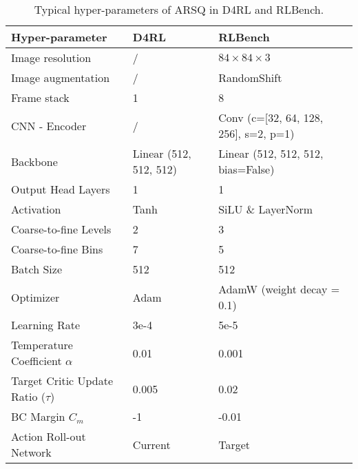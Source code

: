 \begin{table}[ht]
\centering
\begin{tabular}{lll}
    \toprule
    Hyper-parameter & D4RL & RLBench \\
    \midrule
    Image resolution & / & $84 \times 84 \times 3$ \\
    Image augmentation & / & RandomShift \\
    Frame stack & 1 & 8 \\
    \midrule
    CNN - Encoder & / & Conv (c=[32, 64, 128, 256], s=2, p=1) \\
    Backbone & Linear (512, 512, 512) & Linear (512, 512, 512, bias=False) \\
    Output Head Layers & 1 & 1 \\
    Activation & Tanh & SiLU \& LayerNorm \\
    \midrule
    Coarse-to-fine Levels & 2 & 3 \\
    Coarse-to-fine Bins & 7 & 5 \\
    \midrule
    Batch Size & 512 & 512 \\
    Optimizer & Adam & AdamW (weight decay = 0.1) \\
    Learning Rate & 3e-4 & 5e-5 \\
    Temperature Coefficient $\alpha$ & 0.01 & 0.001 \\
    Target Critic Update Ratio ($\tau$) & 0.005 & 0.02 \\
    BC Margin $C_m$ & -1 & -0.01 \\
    Action Roll-out Network & Current & Target \\
    \bottomrule
\end{tabular}
\caption{Typical hyper-parameters of ARSQ in D4RL and RLBench.}
\label{tab:alg-hyperparam}
\end{table}